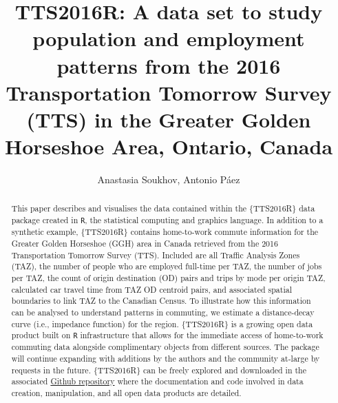 \documentclass[Royal,times,sageh]{sagej}
\begin{document}

\title{TTS2016R: A data set to study population and employment patterns
from the 2016 Transportation Tomorrow Survey (TTS) in the Greater Golden
Horseshoe Area, Ontario, Canada}

\runninghead{}

\author{Anastasia Soukhov\affilnum{}, Antonio Páez\affilnum{}}

\affiliation{\affilnum{}{}}



\begin{abstract}
This paper describes and visualises the data contained within the
\{TTS2016R\} data package created in \texttt{R}, the statistical
computing and graphics language. In addition to a synthetic example,
\{TTS2016R\} contains home-to-work commute information for the Greater
Golden Horseshoe (GGH) area in Canada retrieved from the 2016
Transportation Tomorrow Survey (TTS). Included are all Traffic Analysis
Zones (TAZ), the number of people who are employed full-time per TAZ,
the number of jobs per TAZ, the count of origin destination (OD) pairs
and trips by mode per origin TAZ, calculated car travel time from TAZ OD
centroid pairs, and associated spatial boundaries to link TAZ to the
Canadian Census. To illustrate how this information can be analysed to
understand patterns in commuting, we estimate a distance-decay curve
(i.e., impedance function) for the region. \{TTS2016R\} is a growing
open data product built on \texttt{R} infrastructure that allows for the
immediate access of home-to-work commuting data alongside complimentary
objects from different sources. The package will continue expanding with
additions by the authors and the community at-large by requests in the
future. \{TTS2016R\} can be freely explored and downloaded in the
associated \href{https://github.com/soukhova/TTS2016R}{Github
repository} where the documentation and code involved in data creation,
manipulation, and all open data products are detailed.
\end{abstract}


\maketitle
\end{document}
